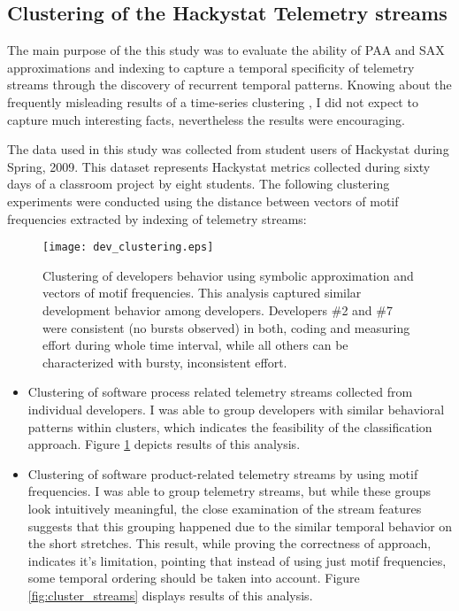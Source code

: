 \subsection{Clustering of the Hackystat Telemetry streams}
The main purpose of the this study was to evaluate the ability of PAA and SAX approximations and indexing to capture a temporal specificity of telemetry streams through the discovery of recurrent temporal patterns. Knowing about the frequently misleading results of a time-series clustering \cite{citeulike:227029}, I did not expect to capture much interesting facts, nevertheless the results were encouraging.

The data used in this study was collected from student users of Hackystat during Spring, 2009. This dataset represents Hackystat metrics collected during sixty days of a classroom project by eight students. The following clustering experiments were conducted using the distance between vectors of motif frequencies extracted by indexing of telemetry streams:

\begin{figure}[tbp]
   \centering
   \texttt{[image: dev\_clustering.eps]}
   \caption{Clustering of developers behavior using symbolic approximation and vectors of motif frequencies. This analysis captured similar development behavior among developers. Developers \#2 and \#7 were consistent (no bursts observed) in both, coding and measuring effort during whole time interval, while all others can be characterized with bursty, inconsistent effort.}
   \label{fig:cluster_developers}
\end{figure}

\begin{itemize}
	\item Clustering of software process related telemetry streams collected from individual developers. I was able to group developers with similar behavioral patterns within clusters, which indicates the feasibility of the classification approach. Figure \ref{fig:cluster_developers} depicts results of this analysis.
	\item Clustering of software product-related telemetry streams by using motif frequencies. I was able to group telemetry streams, but while these groups look intuitively meaningful, the close examination of the stream features suggests that this grouping happened due to the similar temporal behavior on the short stretches. This result, while proving the correctness of approach, indicates it's limitation, pointing that instead of using just motif frequencies, some temporal ordering should be taken into account. Figure \ref{fig:cluster_streams} displays results of this analysis.
\end{itemize}

